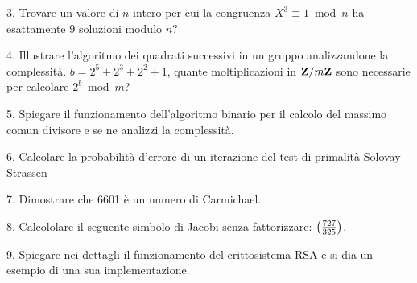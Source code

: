 \item{3.} Trovare un valore di $n$ intero per cui la congruenza $X^3\equiv 1\bmod n$ ha esattamente $9$ soluzioni modulo $n$?
\vv


\item{4.} Illustrare l'algoritmo dei quadrati successivi in un gruppo analizzandone la complessit\`{a}. $b=2^5+2^3+2^2+1$,
quante moltiplicazioni in ${\bf Z}/m{\bf Z}$ sono necessarie per calcolare $2^b\bmod m$?

 \vv


\item{5.} Spiegare il funzionamento dell'algoritmo binario per il calcolo del massimo comun divisore e se ne analizzi la
complessit\`{a}.
\ve\vs

\item{6.} Calcolare la probabilit\`{a} d'errore di un iterazione del test di primalit\`{a} Solovay Strassen
\vv

\item{7.} Dimostrare che 6601 \`{e} un numero di Carmichael.
\ve \vs

\item{8.} Calcololare il seguente simbolo di Jacobi senza fattorizzare: $\left({727\over325}\right)$.
\vv

\item{9.}
 Spiegare nei dettagli il funzionamento del crittosistema RSA e si dia un esempio di una sua implementazione.
\ \vst

 \bye
